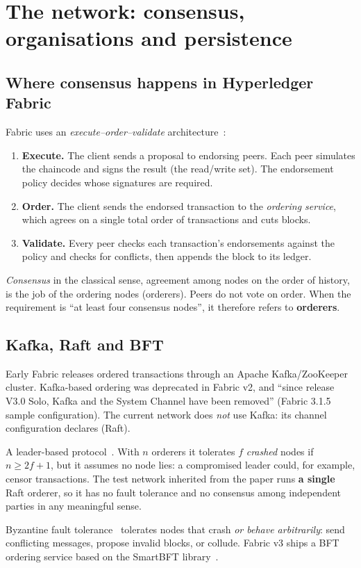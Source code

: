 \section{The network: consensus, organisations and persistence}
\label{sec:network}

\subsection{Where consensus happens in Hyperledger Fabric}
Fabric uses an \emph{execute--order--validate} architecture~\cite{androulaki2018}:
\begin{enumerate}[nosep]
  \item \textbf{Execute.} The client sends a proposal to endorsing peers. Each peer simulates the chaincode and signs the result (the read/write set). The endorsement policy decides whose signatures are required.
  \item \textbf{Order.} The client sends the endorsed transaction to the \emph{ordering service}, which agrees on a single total order of transactions and cuts blocks.
  \item \textbf{Validate.} Every peer checks each transaction's endorsements against the policy and checks for conflicts, then appends the block to its ledger.
\end{enumerate}
\emph{Consensus} in the classical sense, agreement among nodes on the order of history, is the job of the ordering nodes (orderers). Peers do not vote on order. When the requirement is \enquote{at least four consensus nodes}, it therefore refers to \textbf{orderers}.

\subsection{Kafka, Raft and BFT}
\begin{description}[style=nextline,leftmargin=1.2em]
  \item[Kafka (not used).] Early Fabric releases ordered transactions through an Apache Kafka/ZooKeeper cluster. Kafka-based ordering was deprecated in Fabric v2, and \enquote{since release V3.0 Solo, Kafka and the System Channel have been removed} (Fabric 3.1.5 sample configuration). The current network does \emph{not} use Kafka: its channel configuration declares  (Raft).
  \item[Raft (current, crash fault tolerant).] A leader-based protocol~\cite{ongaro2014}. With $n$ orderers it tolerates $f$ \emph{crashed} nodes if $n \ge 2f+1$, but it assumes no node lies: a compromised leader could, for example, censor transactions. The test network inherited from the paper runs \textbf{a single} Raft orderer, so it has no fault tolerance and no consensus among independent parties in any meaningful sense.
  \item[BFT (decided).] Byzantine fault tolerance~\cite{lamport1982,castro1999} tolerates nodes that crash \emph{or behave arbitrarily}: send conflicting messages, propose invalid blocks, or collude. Fabric v3 ships a BFT ordering service based on the SmartBFT library~\cite{barger2021,fabricdocs}.
\end{description}

